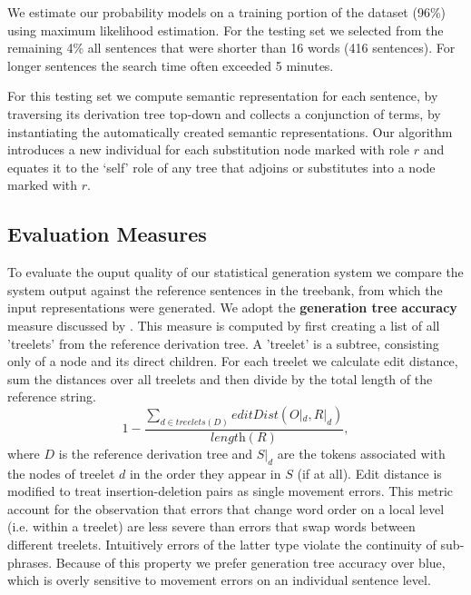 We estimate our probability models on a training portion of the dataset (96\%) using maximum likelihood estimation.
For the testing set we selected from the remaining 4\% all sentences that were shorter than 16 words (416 sentences). For longer sentences the search time often exceeded 5 minutes. 

For this testing set we compute semantic representation for each sentence, by traversing its derivation tree top-down and collects a conjunction of terms, by instantiating the automatically created semantic representations. Our algorithm introduces a new individual for each substitution node marked with role $r$ and equates it to the `self' role of any tree that adjoins or substitutes into a node marked with $r$. 

\subsection{Evaluation Measures}
\label{ssec:eval-measures}
To evaluate the ouput quality of our statistical generation system we compare the system output against the reference sentences in the treebank, from which the input representations were generated. We adopt the {\bf generation tree accuracy} measure discussed by \cite{bangalorerambowwhittaker2001}.
This measure is computed by first creating a list of all 'treelets' from the reference derivation tree. A 'treelet' is a subtree, consisting only of a node and its direct children. For each treelet we calculate edit distance, sum the distances over all treelets and then divide by the total length of the reference string.
$$1 - \frac{\sum\limits_{d \in treelets(D)} editDist(O|_d, R|_d)}{\textit{length}(R)},$$
where $D$ is the reference derivation tree and $S|_d$ are the tokens associated with the nodes of treelet $d$ in the order they appear in $S$ (if at all). 
Edit distance is modified to treat insertion-deletion pairs as single movement errors. 
This metric account for the observation that errors that change word order on a local level (i.e. within a treelet) are less severe than errors that swap words between different treelets. Intuitively errors of the latter type violate the continuity of sub-phrases. Because of this property we prefer generation tree accuracy over {\sc blue}, which is overly sensitive to movement errors on an individual sentence level.


